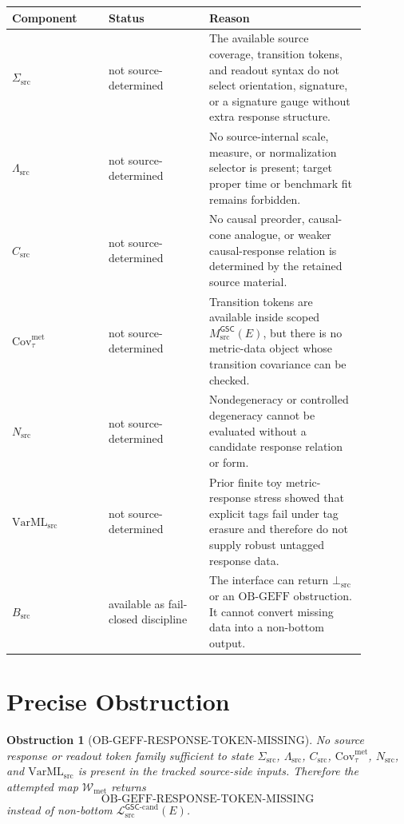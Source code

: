 \documentclass[11pt]{article}
\newcommand{\MsrcGSC}{M_{\mathrm{src}}^{\mathsf{GSC}}}
\newcommand{\MetricDataCand}{\mathcal{L}_{\mathrm{src}}^{\mathsf{GSC}\mbox{-}\mathrm{cand}}}
\newcommand{\BottomSrc}{\bot_{\mathrm{src}}}
\newtheorem{obstruction}{Obstruction}
\begin{document}
\begin{longtable}{p{0.24\linewidth}p{0.25\linewidth}p{0.39\linewidth}}
\toprule
Component & Status & Reason \\
\midrule
\(\Sigma_{\mathrm{src}}\) & not source-determined & The available source
coverage, transition tokens, and readout syntax do not select orientation,
signature, or a signature gauge without extra response structure. \\
\(\Lambda_{\mathrm{src}}\) & not source-determined & No source-internal scale,
measure, or normalization selector is present; target proper time or benchmark
fit remains forbidden. \\
\(C_{\mathrm{src}}\) & not source-determined & No causal preorder, causal-cone
analogue, or weaker causal-response relation is determined by the retained
source material. \\
\(\mathrm{Cov}_{\tau}^{\mathrm{met}}\) & not source-determined & Transition
tokens are available inside scoped \(\MsrcGSC(E)\), but there is no
metric-data object whose transition covariance can be checked. \\
\(N_{\mathrm{src}}\) & not source-determined & Nondegeneracy or controlled
degeneracy cannot be evaluated without a candidate response relation or form.
\\
\(\mathrm{VarML}_{\mathrm{src}}\) & not source-determined & Prior finite toy
metric-response stress showed that explicit tags fail under tag erasure and
therefore do not supply robust untagged response data. \\
\(B_{\mathrm{src}}\) & available as fail-closed discipline & The interface can
return \(\BottomSrc\) or an \(\mathrm{OB\mbox{-}GEFF}\) obstruction. It cannot
convert missing data into a non-bottom output. \\
\bottomrule
\end{longtable}

\section{Precise Obstruction}

\begin{obstruction}[OB-GEFF-RESPONSE-TOKEN-MISSING]
No source response or readout token family sufficient to state
\(\Sigma_{\mathrm{src}}\), \(\Lambda_{\mathrm{src}}\),
\(C_{\mathrm{src}}\), \(\mathrm{Cov}_{\tau}^{\mathrm{met}}\),
\(N_{\mathrm{src}}\), and \(\mathrm{VarML}_{\mathrm{src}}\) is present in the
tracked source-side inputs. Therefore the attempted map
\(\mathcal{W}_{\mathrm{met}}\) returns
\[
  \mathrm{OB\mbox{-}GEFF\mbox{-}RESPONSE\mbox{-}TOKEN\mbox{-}MISSING}
\]
instead of non-bottom \(\MetricDataCand(E)\).
\end{obstruction}
\end{document}

